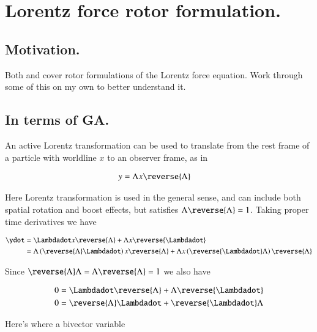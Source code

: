 \chapter{Lorentz force rotor formulation.}
\date{ March 18, 2009.  $RCSfile: electronRotor.tex,v $ Last $Revision: 1.13 $ $Date: 2009/06/11 16:45:58 $ }

\section{Motivation. }

Both \cite{baylis-2007} and \cite{doran2003gap} cover rotor formulations
of the Lorentz force equation.  Work through some of this on my own to 
better understand it.

\section{In terms of GA. }

An active Lorentz transformation can be used to translate from the rest frame of a particle with worldline $x$ to 
an observer frame, as in

\begin{align}\label{eqn:eRotor:LorentzTx}
y &= \Lambda x \reverse{\Lambda}
\end{align}

Here Lorentz transformation is used in the general sense, and can include both spatial rotation and boost effects, but satisfies $\Lambda\reverse{\Lambda} = 1$.  Taking proper time derivatives we have

\begin{align*}
\ydot 
&= \Lambdadot x \reverse{\Lambda} + \Lambda x \reverse{\Lambdadot} \\
&= \Lambda \left(\reverse{\Lambda} \Lambdadot\right) x \reverse{\Lambda} + \Lambda x \left(\reverse{\Lambdadot} \Lambda \right) \reverse{\Lambda} \\
\end{align*}

Since $\reverse{\Lambda}\Lambda = \Lambda\reverse{\Lambda} = 1$ we also have

\begin{align*}
0 &= \Lambdadot\reverse{\Lambda} + \Lambda\reverse{\Lambdadot}  \\
0 &= \reverse{\Lambda}\Lambdadot + \reverse{\Lambdadot}\Lambda
\end{align*}

Here's where a bivector variable 

